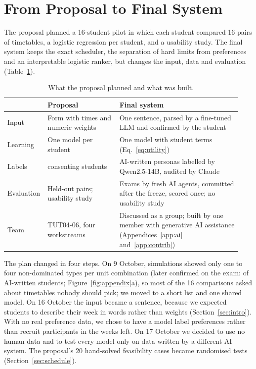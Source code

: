 \section{From Proposal to Final System}\label{sec:change}

The proposal planned a 16-student pilot in which each student compared 16 pairs of timetables, a logistic regression per student, and a usability study. The final system keeps the exact scheduler, the separation of hard limits from preferences and an interpretable logistic ranker, but changes the input, data and evaluation (Table~\ref{tab:change}).

\begin{table}[h]
	\caption{What the proposal planned and what was built.}
	\label{tab:change}
	\centering\small
	\begin{tabular}{@{}>{\raggedright\arraybackslash}p{0.13\linewidth}>{\raggedright\arraybackslash}p{0.3\linewidth}>{\raggedright\arraybackslash}p{0.51\linewidth}@{}}
		\toprule
		& Proposal & Final system \\
		\midrule
		Input & Form with times and numeric weights & One sentence, parsed by a fine-tuned LLM and confirmed by the student \\
		Learning & One model per student & One model with student terms (Eq.~\ref{eq:utility}) \\
		Labels & 16 consenting students & AI-written personas labelled by Qwen2.5-14B, audited by Claude \\
		Evaluation & Held-out pairs; usability study & Exams by fresh AI agents, committed after the freeze, scored once; no usability study \\
		Team & TUT04-06, four workstreams & Discussed as a group; built by one member with generative AI assistance (Appendices~\ref{app:ai} and~\ref{app:contrib}) \\
		\bottomrule
	\end{tabular}
\end{table}

The plan changed in four steps. On 9 October, simulations showed only one to four non-dominated types per unit combination (later confirmed on the exam: \figSmallFront{} of \figStudents{} AI-written students; Figure~\ref{fig:appendix}a), so most of the 16 comparisons asked about timetables nobody should pick; we moved to a short list and one shared model. On 16 October the input became a sentence, because we expected students to describe their week in words rather than weights (Section~\ref{sec:intro}). With no real preference data, we chose to have a model label preferences rather than recruit participants in the weeks left. On 17 October we decided to use no human data and to test every model only on data written by a different AI system. The proposal's 20 hand-solved feasibility cases became randomised tests (Section~\ref{sec:schedule}).
